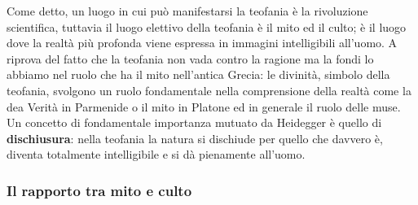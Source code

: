 \documentclass[10pt,a4paper]{article}
\begin{document}
Come detto, un luogo in cui può manifestarsi la teofania è la rivoluzione scientifica, tuttavia il luogo elettivo della teofania è il mito ed il culto; è il luogo dove la realtà più profonda viene espressa in immagini intelligibili all'uomo. A riprova del fatto che la teofania non vada contro la ragione ma la fondi lo abbiamo nel ruolo che ha il mito nell'antica Grecia: le divinità, simbolo della teofania, svolgono un ruolo fondamentale nella comprensione della realtà come la dea Verità in Parmenide o il mito in Platone ed in generale il ruolo delle muse.\\
Un concetto di fondamentale importanza mutuato da Heidegger è quello di \textbf{dischiusura}: nella teofania la natura si dischiude per quello che davvero è, diventa totalmente intelligibile e si dà pienamente all'uomo. 
\subsubsection{Il rapporto tra mito e culto}
\end{document}
